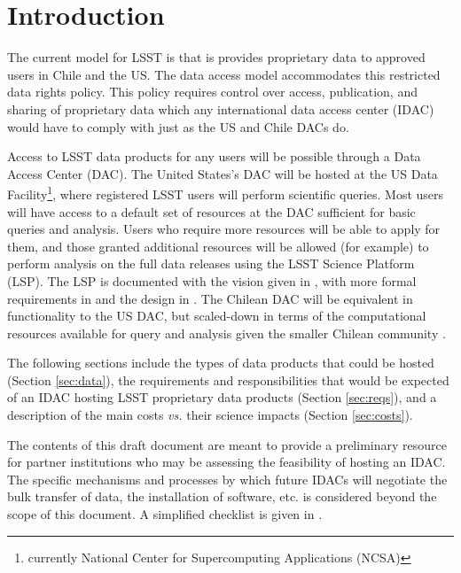 \section{Introduction}\label{sec:intro}


The current model for LSST is that is provides proprietary data to approved users in Chile and the US. The data access model accommodates this restricted data rights policy. This policy requires control over access, publication, and sharing of proprietary data which any international data access center (IDAC) would have to comply with just as the US and Chile DACs do.

Access to LSST data products for any users will be possible through a Data Access Center (DAC). The United States's DAC will be hosted at the US Data Facility\footnote{currently National Center for Supercomputing Applications (NCSA)},
where registered LSST users will perform scientific queries. Most users will have access to a default set of resources at the DAC sufficient for basic queries and analysis. Users who require more resources will be able to apply for them, and those granted additional resources will be allowed (for example) to perform analysis on the full data releases using the LSST Science Platform (LSP). The LSP is documented with the vision given in , with more formal requirements in  and the design in . The Chilean DAC will be equivalent in functionality to the US DAC, but scaled-down in terms of the computational resources available for query and analysis given the smaller Chilean community .

The following sections include the types of data products that could be hosted (Section \ref{sec:data}), the requirements and responsibilities that would be expected of an IDAC hosting LSST proprietary data products (Section \ref{sec:reqs}), and a description of the main costs {\it vs.} their science impacts (Section \ref{sec:costs}).

The contents of this draft document are meant to provide a preliminary resource for partner institutions who may be assessing the feasibility of hosting an IDAC. The specific mechanisms and processes by which future IDACs will negotiate the bulk transfer of data, the installation of software, etc. is considered beyond the scope of this document. A simplified checklist is given in .

